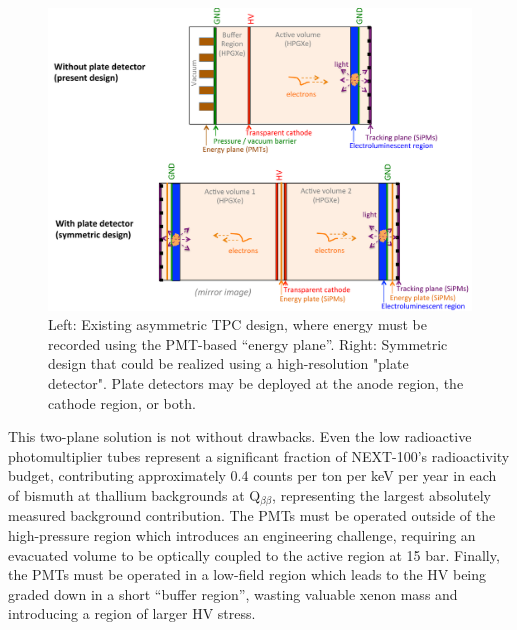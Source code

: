 \begin{figure}[t]
\begin{centering}
\includegraphics[width=0.85\columnwidth]{./images/PlateDetectorNEXT.pdf}
\par\end{centering}

\caption{Left: Existing asymmetric TPC design, where energy must be recorded using the PMT-based ``energy plane''.  Right: Symmetric design that could be realized using a high-resolution "plate detector".  Plate detectors may be deployed at the anode region, the cathode region, or both. \label{fig:PlateDetectorNEXT}}
\end{figure}


This two-plane solution is not without drawbacks. Even the low radioactive photomultiplier tubes represent a significant fraction of NEXT-100's radioactivity budget, contributing approximately 0.4 counts per ton per keV per year in each of bismuth at thallium backgrounds at Q$_{\beta\beta}$, representing the largest absolutely measured background contribution.  The PMTs must be operated outside of the high-pressure region which introduces an engineering challenge, requiring an evacuated volume to be optically coupled to the active region at 15 bar. Finally, the PMTs must be operated in a low-field region which leads to the HV being graded down in a short ``buffer region'', wasting valuable xenon mass and introducing a region of larger HV stress.

